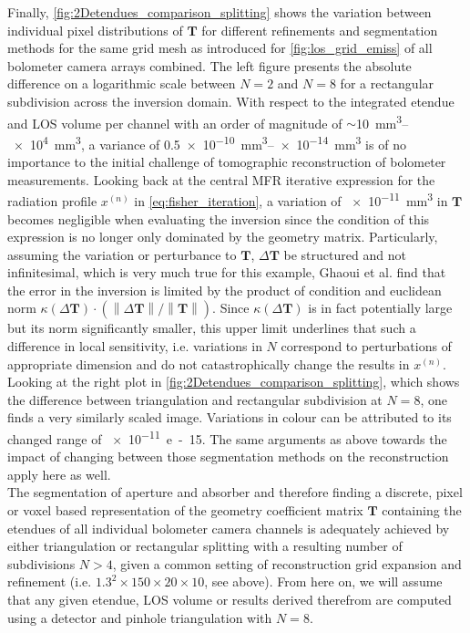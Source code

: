             Finally, \cref{fig:2Detendues_comparison_splitting} shows the variation between individual pixel distributions of $\mathbf{T}$ for different refinements and segmentation methods for the same grid mesh as introduced for \cref{fig:los_grid_emiss} of all bolometer camera arrays combined. The left figure presents the absolute difference on a logarithmic scale between $N=2$ and $N=8$ for a rectangular subdivision across the inversion domain. With respect to the integrated etendue and LOS volume per channel with an order of magnitude of $\sim$\SIrange{10}{e4}{\cubic\milli\meter}, a variance of \SIrange{0.5e-10}{e-14}{\cubic\milli\meter} is of no importance to the initial challenge of tomographic reconstruction of bolometer measurements. Looking back at the central MFR iterative expression for the radiation profile $x^{\left(n\right)}$ in \cref{eq:fisher_iteration}, a variation of \SI{e-11}{\cubic\milli\meter} in $\mathbf{T}$ becomes negligible when evaluating the inversion since the condition of this expression is no longer only dominated by the geometry matrix. Particularly, assuming the variation or perturbance to $\mathbf{T}$, $\Delta\mathbf{T}$ be structured and not infinitesimal, which is very much true for this example, Ghaoui et al.\cite{Ghaoui2002} find that the error in the inversion is limited by the product of condition and euclidean norm $\kappa\left(\Delta\mathbf{T}\right)\cdot\left(\left\|\Delta \mathbf{T}\right\|/\left\|\mathbf{T}\right\|\right)$. Since $\kappa\left(\Delta\mathbf{T}\right)$ is in fact potentially large but its norm significantly smaller, this upper limit underlines that such a difference in local sensitivity, i.e. variations in $N$ correspond to perturbations of appropriate dimension and do not catastrophically change the results in $x^{\left(n\right)}$. Looking at the right plot in \cref{fig:2Detendues_comparison_splitting}, which shows the difference between triangulation and rectangular subdivision at $N=8$, one finds a very similarly scaled image. Variations in colour can be attributed to its changed range of \SI{e-11}{e-15}. The same arguments as above towards the impact of changing between those segmentation methods on the reconstruction apply here as well.\\%
            The segmentation of aperture and absorber and therefore finding a discrete, pixel or voxel based representation of the geometry coefficient matrix $\mathbf{T}$ containing the etendues of all individual bolometer camera channels is adequately achieved by either triangulation or rectangular splitting with a resulting number of subdivisions $N>4$, given a common setting of reconstruction grid expansion and refinement (i.e. $1.3^{2}\times150\times20\times10$, see above). From here on, we will assume that any given etendue, LOS volume or results derived therefrom are computed using a detector and pinhole triangulation with $N=8$.\\%
%
